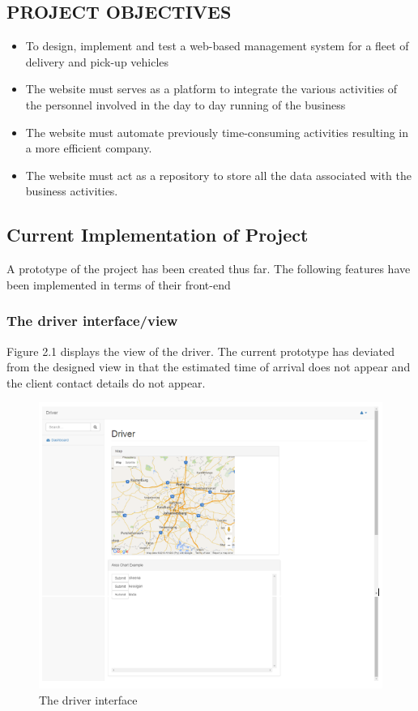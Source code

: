 \documentclass[paper=a4, fontsize=11pt]{scrartcl} %
\numberwithin{equation}{section} %
\numberwithin{figure}{section} %
\numberwithin{table}{section} %
\begin{document}
%
\subsection{PROJECT OBJECTIVES}

\begin{itemize}
\item To design, implement and test a web-based management system for a fleet of delivery and pick-up vehicles
\item The website must serves as a platform to integrate the various activities of the personnel involved in the day to day running of the business
\item The website must automate previously time-consuming activities resulting in a  more efficient company.
\item The website must act as a repository  to store all the data associated with the business activities.
\end{itemize}

\subsection{Current Implementation of Project}

A prototype of the project has been created thus far. The following features have been implemented in terms of their front-end


\subsubsection{The driver interface/view}
 Figure 2.1 displays the view of the driver. The current prototype has deviated from the designed view in that the estimated time of arrival does not appear and the client contact details do not appear.
\begin{figure}[hbt!]
\centering
\includegraphics[width=5in]{screenshots/driver.png}
\caption{The driver interface}
\label{Driver}
\end{figure}
\end{document}
